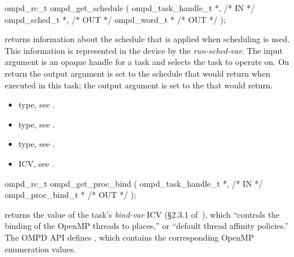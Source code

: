 %
\summary

\format
\cspecificstart
\begin{boxedcode}
ompd\_rc\_t ompd\_get\_schedule (
  ompd\_task\_handle\_t        *,                           /* IN */
  ompd\_sched\_t              *,                                 /* OUT */
  ompd\_word\_t              *                              /* OUT */
); 
\end{boxedcode}
\cspecificend

\descr

 returns information about the schedule that is
applied when  scheduling is used.
%
This information is represented in the device by the
\emph{run-sched-var}.
\argdesc
The input argument  is an opaque handle for a task and selects the task to operate on.
On return the output argument  is set to the schedule that  would return when
executed in this task; the output argument  is set to the  that 
 would return.


\crossreferences
\begin{itemize}
	\item {} type, see .
	\item {} type, see .
	\item {} type, see .
	\item {} ICV, see .
\end{itemize}


%
\summary

\format
\cspecificstart
\begin{boxedcode}
ompd\_rc\_t ompd\_get\_proc\_bind (
  ompd\_task\_handle\_t        *,                           /* IN */
  ompd\_proc\_bind\_t          *                                  /* OUT */
); 
\end{boxedcode}
\cspecificend

\descr
{} returns the value of the task's
\emph{bind-var} ICV (\S2.3.1 of~\cite{OpenMP}), which ``controls the
binding of the OpenMP threads to places,'' or ``default thread
affinity policies.''
%
The OMPD API defines
, which
contains the corresponding OpenMP enumeration values.
%

